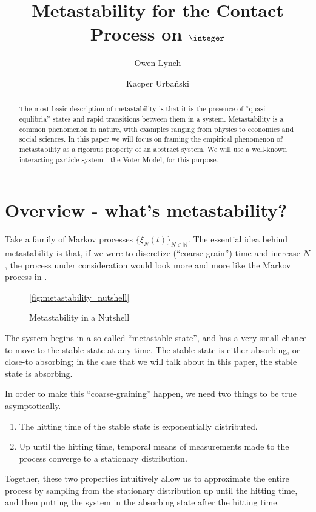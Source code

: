 \documentclass{scrartcl}
\title{Metastability for the Contact Process on $\integer$}
\author{Owen Lynch \and Kacper Urbański}
\begin{document}
\maketitle
\begin{abstract}
The most basic description of metastability is that it is the presence of ``quasi-equlibria'' states and rapid transitions between them in a system. Metastability is
a common phenomenon in nature, with examples ranging from physics to economics and social sciences. In this paper we will focus on framing the empirical phenomenon of metastability
as a rigorous property of an abstract system. We will use a well-known interacting particle system - the Voter Model, for this purpose. 
\end{abstract}

\section{Overview - what's metastability?}

Take a family of Markov processes $\{\xi_N(t)\}_{N\in\mathbb{N}}$. The essential idea behind metastability is that, if we were to discretize (``coarse-grain'') time and increase $N$, 
the process under consideration would look more and more like the Markov process in .

\begin{figure}[h!]
  \centering

  \caption{Metastability in a Nutshell}
  \ref{fig:metastability_nutshell}
\end{figure}

The system begins in a so-called ``metastable state'', and has a very small chance to move to the stable state at any time. The stable state is either absorbing, or close-to absorbing; in the case that we will talk about in this paper, the stable state is absorbing.

In order to make this ``coarse-graining'' happen, we need two things to be true asymptotically.

\begin{enumerate}
  \item The hitting time of the stable state is exponentially distributed.
  \item Up until the hitting time, temporal means of measurements made to the process converge to a stationary distribution.
\end{enumerate}

Together, these two properties intuitively allow us to approximate the entire process by sampling from the stationary distribution up until the hitting time, and then putting the system in the absorbing state after the hitting time.
\end{document}
